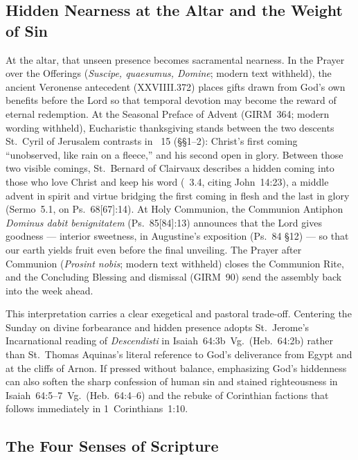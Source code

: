 \subsection{Hidden Nearness at the Altar and the Weight of Sin}

At the altar, that unseen presence becomes sacramental nearness. In the Prayer over the Offerings (\emph{Suscipe, quaesumus, Domine}; modern text withheld), the ancient Veronense antecedent (XXVIIII.372) places gifts drawn from God's own benefits before the Lord so that temporal devotion may become the reward of eternal redemption. At the Seasonal Preface of Advent (GIRM~364; modern wording withheld), Eucharistic thanksgiving stands between the two descents St.~Cyril of Jerusalem contrasts in ~15 (§§1--2): Christ's first coming ``unobserved, like rain on a fleece,'' and his second open in glory. Between those two visible comings, St.~Bernard of Clairvaux describes a hidden coming into those who love Christ and keep his word (~3.4, citing John~14:23), a middle advent in spirit and virtue bridging the first coming in flesh and the last in glory (Sermo~5.1, on Ps.~68[67]:14). At Holy Communion, the Communion Antiphon \emph{Dominus dabit benignitatem} (Ps.~85[84]:13) announces that the Lord gives goodness --- interior sweetness, in Augustine's exposition (Ps.~84 §12) --- so that our earth yields fruit even before the final unveiling. The Prayer after Communion (\emph{Prosint nobis}; modern text withheld) closes the Communion Rite, and the Concluding Blessing and dismissal (GIRM~90) send the assembly back into the week ahead.

This interpretation carries a clear exegetical and pastoral trade-off. Centering the Sunday on divine forbearance and hidden presence adopts St.~Jerome's Incarnational reading of \emph{Descendisti} in Isaiah~64:3b~Vg.\ (Heb.~64:2b) rather than St.~Thomas Aquinas's literal reference to God's deliverance from Egypt and at the cliffs of Arnon. If pressed without balance, emphasizing God's hiddenness can also soften the sharp confession of human sin and stained righteousness in Isaiah~64:5--7~Vg.\ (Heb.~64:4--6) and the rebuke of Corinthian factions that follows immediately in 1~Corinthians~1:10.

\subsection{The Four Senses of Scripture}

